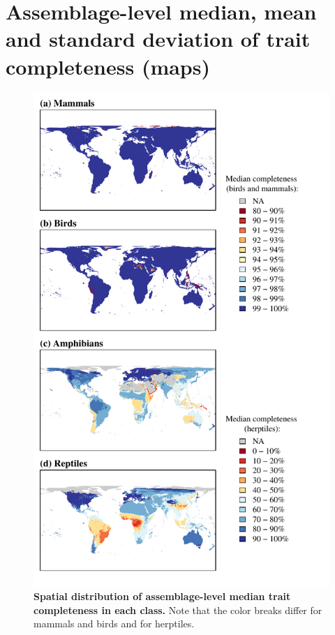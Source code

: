 \newpage
\pagebreak

\section{Assemblage-level median, mean and standard deviation of trait completeness (maps)}

\begin{figure}[h!]
\vspace*{-2cm}
\centering
\includegraphics[scale=0.95]{Supporting/Chapter2/Figures/Maps/Median_map}
\caption[Spatial distribution of  assemblage-level median trait completeness in each class.]{\textbf{Spatial distribution of  assemblage-level median trait completeness in each class.} Note that the color breaks differ for mammals and birds and for herptiles.}
\label{SI2_mediancomp_spatial}
\end{figure}

